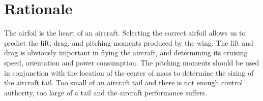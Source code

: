 \section{Rationale}
\begin{comment}
\end{comment}
The airfoil is the heart of an aircraft. 
Selecting the correct airfoil allows us to predict the lift, drag, and pitching moments produced by the wing. 
The lift and drag is obviously important in flying the aircraft, and determining its cruising speed, orientation and power consumption.
The pitching moments should be used in conjunction with the location of the center of mass to determine the sizing of the aircraft tail. 
Too small of an aircraft tail and there is not enough control authority, too large of a tail and the aircraft performance suffers.


